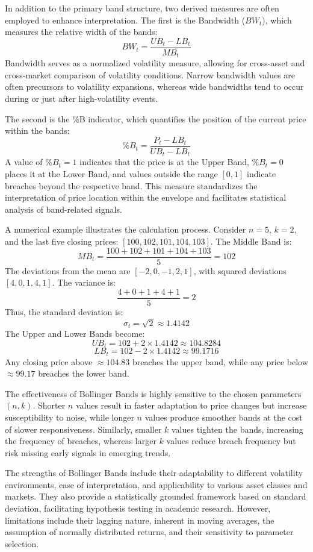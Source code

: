 In addition to the primary band structure, two derived measures are often employed to enhance interpretation. The first is the Bandwidth ($BW_t$), which measures the relative width of the bands:
\[
BW_t = \frac{UB_t - LB_t}{MB_t}
\]
Bandwidth serves as a normalized volatility measure, allowing for cross-asset and cross-market comparison of volatility conditions. Narrow bandwidth values are often precursors to volatility expansions, whereas wide bandwidths tend to occur during or just after high-volatility events.

The second is the \%B indicator, which quantifies the position of the current price within the bands:
\[
\%B_t = \frac{P_t - LB_t}{UB_t - LB_t}
\]
A value of $\%B_t = 1$ indicates that the price is at the Upper Band, $\%B_t = 0$ places it at the Lower Band, and values outside the range $[0, 1]$ indicate breaches beyond the respective band. This measure standardizes the interpretation of price location within the envelope and facilitates statistical analysis of band-related signals.

A numerical example illustrates the calculation process. Consider $n=5$, $k=2$, and the last five closing prices: $[100, 102, 101, 104, 103]$. The Middle Band is:
\[
MB_t = \frac{100 + 102 + 101 + 104 + 103}{5} = 102
\]
The deviations from the mean are $[-2, 0, -1, 2, 1]$, with squared deviations $[4, 0, 1, 4, 1]$. The variance is:
\[
\frac{4+0+1+4+1}{5} = 2
\]
Thus, the standard deviation is:
\[
\sigma_t = \sqrt{2} \approx 1.4142
\]
The Upper and Lower Bands become:
\[
UB_t = 102 + 2 \times 1.4142 \approx 104.8284
\]
\[
LB_t = 102 - 2 \times 1.4142 \approx 99.1716
\]
Any closing price above $\approx 104.83$ breaches the upper band, while any price below $\approx 99.17$ breaches the lower band.

The effectiveness of Bollinger Bands is highly sensitive to the chosen parameters $(n, k)$. Shorter $n$ values result in faster adaptation to price changes but increase susceptibility to noise, while longer $n$ values produce smoother bands at the cost of slower responsiveness. Similarly, smaller $k$ values tighten the bands, increasing the frequency of breaches, whereas larger $k$ values reduce breach frequency but risk missing early signals in emerging trends.

The strengths of Bollinger Bands include their adaptability to different volatility environments, ease of interpretation, and applicability to various asset classes and markets. They also provide a statistically grounded framework based on standard deviation, facilitating hypothesis testing in academic research. However, limitations include their lagging nature, inherent in moving averages, the assumption of normally distributed returns, and their sensitivity to parameter selection.







